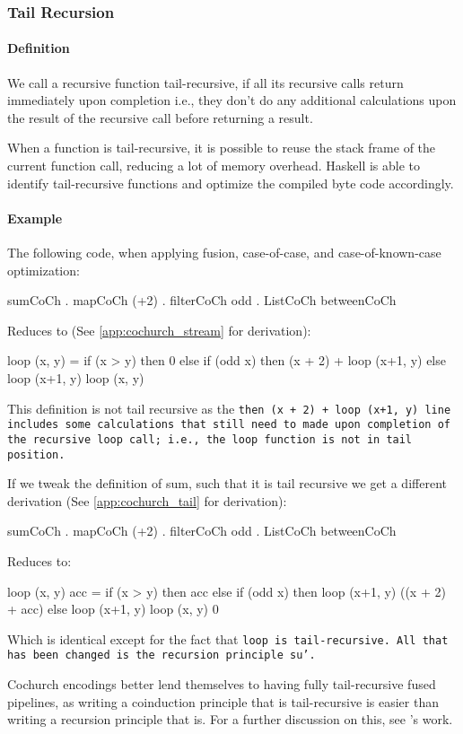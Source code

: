 
\subsubsection{Tail Recursion}\label{sec:tail}
\paragraph{Definition}
We call a recursive function tail-recursive, if all its recursive calls return immediately upon completion i.e., they don't do any additional calculations upon the result of the recursive call before returning a result.

When a function is tail-recursive, it is possible to reuse the stack frame of the current function call, reducing a lot of memory overhead.
Haskell is able to identify tail-recursive functions and optimize the compiled byte code accordingly.

\paragraph{Example}
The following code, when applying fusion, case-of-case, and case-of-known-case optimization:
\begin{spec}
sumCoCh . mapCoCh (+2) . filterCoCh odd . ListCoCh betweenCoCh
\end{spec}
Reduces to (See \autoref{app:cochurch_stream} for derivation):
\begin{spec}
loop (x, y) = if (x > y)
              then 0
              else if (odd x)
                   then (x + 2) + loop (x+1, y)
                   else loop (x+1, y)
loop (x, y)
\end{spec}
This definition is not tail recursive as the \tt{then (x + 2) + loop (x+1, y)} line includes some calculations that still need to made upon completion of the recursive \tt{loop} call; i.e., the \tt{loop} function is not in tail position.

If we tweak the definition of sum, such that it is tail recursive we get a different derivation (See \autoref{app:cochurch_tail} for derivation):
\begin{spec}
sumCoCh . mapCoCh (+2) . filterCoCh odd . ListCoCh betweenCoCh
\end{spec}
Reduces to:
\begin{spec}
loop (x, y) acc = if (x > y)
                  then acc
                  else if (odd x)
                       then loop (x+1, y) ((x + 2) + acc)
                       else loop (x+1, y)
loop (x, y) 0
\end{spec}
Which is identical except for the fact that \tt{loop} is tail-recursive.
All that has been changed is the recursion principle \tt{su'}.

Cochurch encodings better lend themselves to having fully tail-recursive fused pipelines, as writing a coinduction principle that is tail-recursive is easier than writing a recursion principle that is.
For a further discussion on this, see \cite{Breitner2018}'s work.
